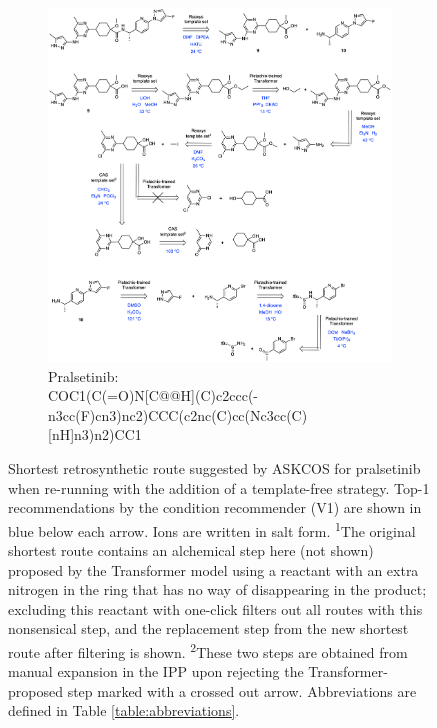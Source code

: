 \documentclass[pdflatex,sn-mathphys-num]{sn-jnl}%
\theoremstyle{thmstyleone}%
\theoremstyle{thmstyletwo}%
\theoremstyle{thmstylethree}%
\begin{document}
\clearpage

\begin{figure}[h!]
    \captionsetup[subfigure]{labelformat=empty}
    \begin{subfigure}[t]{1.0\textwidth}
        \includegraphics[scale=0.725]{media/SI_study/4i.pralsetinib_i.png}
        \caption{Pralsetinib: \\ \small COC1(C(=O)N[C@@H](C)c2ccc(-n3cc(F)cn3)nc2)CCC(c2nc(C)cc(Nc3cc(C)[nH]n3)n2)CC1}
    \end{subfigure}
    \hfill
    \caption{Shortest retrosynthetic route suggested by ASKCOS for pralsetinib when re-running with the addition of a template-free strategy. Top-1 recommendations by the condition recommender (V1) are shown in blue below each arrow. Ions are written in salt form. \textsuperscript{1}The original shortest route contains an alchemical step here (not shown) proposed by the Transformer model using a reactant with an extra nitrogen in the ring that has no way of disappearing in the product; excluding this reactant with one-click filters out all routes with this nonsensical step, and the replacement step from the new shortest route after filtering is shown. \textsuperscript{2}These two steps are obtained from manual expansion in the IPP upon rejecting the Transformer-proposed step marked with a crossed out arrow. Abbreviations are defined in Table \ref{table:abbreviations}.}
    \label{fig:fda_study_interesting_3}
\end{figure}
\end{document}
